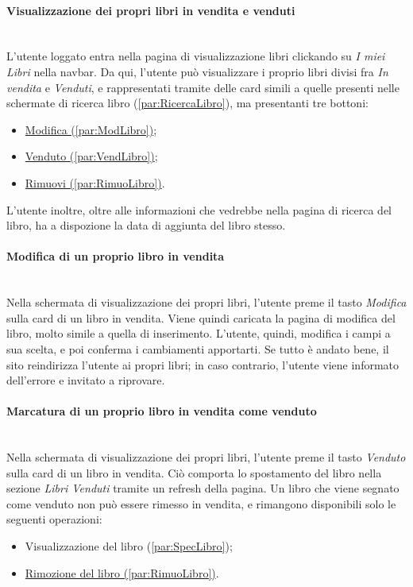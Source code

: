 \paragraph{Visualizzazione dei propri libri in vendita e venduti}\mbox{}\\
\label{par:VisLibriUt}
L'utente loggato entra nella pagina di visualizzazione libri clickando su \textit{I miei Libri} nella navbar. Da qui, l'utente può visualizzare i proprio libri divisi fra \textit{In vendita} e \textit{Venduti}, e rappresentati tramite delle card simili a quelle presenti nelle schermate di ricerca libro (\ref{par:RicercaLibro}), ma presentanti tre bottoni:
\begin{itemize}
	\item \hyperref[par:ModLibro]{Modifica (\ref{par:ModLibro})};
	\item \hyperref[par:VendLibro]{Venduto (\ref{par:VendLibro})};
	\item \hyperref[par:RimuoLibro]{Rimuovi (\ref{par:RimuoLibro})}.
\end{itemize}
L'utente inoltre, oltre alle informazioni che vedrebbe nella pagina di ricerca del libro, ha a dispozione la data di aggiunta del libro stesso.

\paragraph{Modifica di un proprio libro in vendita}\mbox{}\\
\label{par:ModLibro}
Nella schermata di visualizzazione dei propri libri, l'utente preme il tasto \textit{Modifica} sulla card di un libro in vendita. Viene quindi caricata la pagina di modifica del libro, molto simile a quella di inserimento. L'utente, quindi, modifica i campi a sua scelta, e poi conferma i cambiamenti apportarti. Se tutto è andato bene, il sito reindirizza l'utente ai propri libri; in caso contrario, l'utente viene informato dell'errore e invitato a riprovare.

\paragraph{Marcatura di un proprio libro in vendita come venduto}\mbox{}\\
\label{par:VendLibro}
Nella schermata di visualizzazione dei propri libri, l'utente preme il tasto \textit{Venduto} sulla card di un libro in vendita. Ciò comporta lo spostamento del libro nella sezione \textit{Libri Venduti} tramite un refresh della pagina. Un libro che viene segnato come venduto non può essere rimesso in vendita, e rimangono disponibili solo le seguenti operazioni:
\begin{itemize}
	\item Visualizzazione del libro (\ref{par:SpecLibro});
	\item \hyperref[par:RimuoLibro]{Rimozione del libro (\ref{par:RimuoLibro})}.
\end{itemize}


